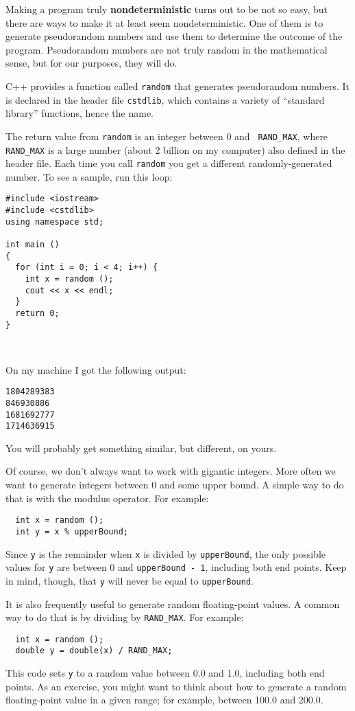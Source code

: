 Making a program truly {\bf nondeterministic} turns out to be not
so easy, but there are ways to make it at least seem
nondeterministic.  One of them is to generate {pseudorandom} numbers and
use them to determine the outcome of the program.
Pseudorandom numbers
are not truly random in the mathematical sense, but 
for our purposes, they will do.

C++ provides a function called {\tt random} that generates
pseudorandom numbers.  It is declared in the
header file {\tt cstdlib}, which contains a variety of ``standard
library'' functions, hence the name.

The return value from {\tt random} is an integer between 0 and {\tt
RAND\_MAX}, where {\tt RAND\_MAX} is a large number (about 2 billion
on my computer) also defined in the header file.  Each time you call
{\tt random} you get a different randomly-generated number.  To see a
sample, run this loop:

\begin{verbatim}
#include <iostream>
#include <cstdlib>
using namespace std;

int main ()
{
  for (int i = 0; i < 4; i++) {
    int x = random ();
    cout << x << endl;
  }
  return 0;
}

  
\end{verbatim}
%
On my machine I got the following output:

\begin{verbatim}
1804289383
846930886
1681692777
1714636915
\end{verbatim}
%
You will probably get something similar, but different, on yours.

Of course, we don't always want to work with gigantic integers.
More often we want to generate integers between 0 and some
upper bound.  A simple way to do that is with the modulus
operator.  For example:

\begin{verbatim}
  int x = random ();
  int y = x % upperBound;
\end{verbatim}
%
Since {\tt y} is the remainder when {\tt x} is divided by
{\tt upperBound}, the only possible values for {\tt y}
are between 0 and {\tt upperBound - 1}, including both
end points.  Keep in mind, though, that {\tt y} will never
be equal to {\tt upperBound}.

It is also frequently useful to generate random floating-point values.
A common way to do that is by dividing by {\tt RAND\_MAX}.  For
example:

\begin{verbatim}
  int x = random ();
  double y = double(x) / RAND_MAX;
\end{verbatim}
%
This code sets {\tt y} to a random value between 0.0 and 1.0,
including both end points.  As an exercise, you might want to
think about how to generate a random floating-point value in
a given range; for example, between 100.0 and 200.0.

